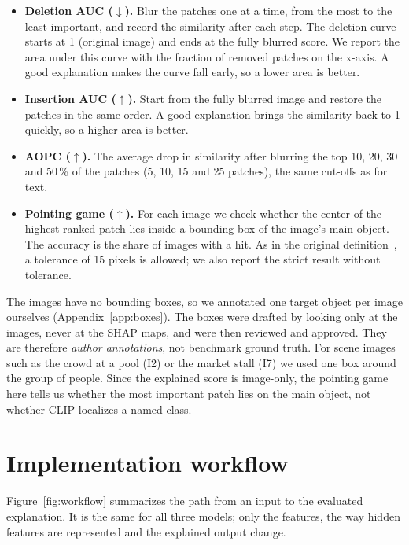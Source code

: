 \documentclass[11pt,a4paper]{article}
\newcommand{\up}{$\uparrow$}
\newcommand{\down}{$\downarrow$}
\begin{document}
\begin{itemize}[leftmargin=*]
  \item \textbf{Deletion AUC (\down).} Blur the patches one at a time, from the most to the
        least important, and record the similarity after each step. The deletion curve
        starts at 1 (original image) and ends at the fully blurred score. We report the
        area under this curve with the fraction of removed patches on the x-axis. A good
        explanation makes the curve fall early, so a lower area is better.
  \item \textbf{Insertion AUC (\up).} Start from the fully blurred image and restore the
        patches in the same order. A good explanation brings the similarity back to 1
        quickly, so a higher area is better.
  \item \textbf{AOPC (\up).} The average drop in similarity after blurring the top 10, 20,
        30 and 50\,\% of the patches (5, 10, 15 and 25 patches), the same cut-offs as for text.
  \item \textbf{Pointing game (\up).} For each image we check whether the center of the
        highest-ranked patch lies inside a bounding box of the image's main object. The
        accuracy is the share of images with a hit. As in the original
        definition~\cite{zhang2018}, a tolerance of 15 pixels is allowed; we also report the
        strict result without tolerance.
\end{itemize}

The images have no bounding boxes, so we annotated one target object per image ourselves
(Appendix~\ref{app:boxes}). The boxes were drafted by looking only at the images, never at
the SHAP maps, and were then reviewed and approved. They are therefore \emph{author
annotations}, not benchmark ground truth. For scene images such as the crowd at a pool (I2)
or the market stall (I7) we used one box around the group of people. Since the explained
score is image-only, the pointing game here tells us whether the most important patch lies
on the main object, not whether CLIP localizes a named class.

\section{Implementation workflow}\label{sec:workflow}

Figure~\ref{fig:workflow} summarizes the path from an input to the evaluated
explanation. It is the same for all three models; only the features, the way hidden
features are represented and the explained output change.
\end{document}
